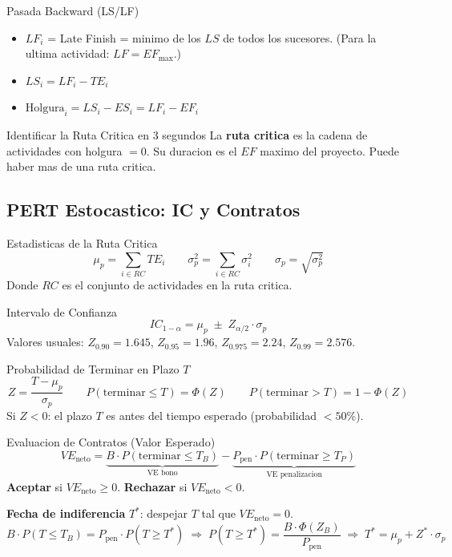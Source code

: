 \documentclass[11pt, a4paper]{article}
\begin{document}
\begin{formulas}{Pasada Backward (LS/LF)}
  \begin{itemize}[leftmargin=1.2em, itemsep=2pt]
    \item $LF_i$ = Late Finish = minimo de los $LS$ de todos los sucesores.
          (Para la ultima actividad: $LF = EF_{\max}$.)
    \item $LS_i = LF_i - TE_i$
    \item $\text{Holgura}_i = LS_i - ES_i = LF_i - EF_i$
  \end{itemize}
\end{formulas}

\begin{tipprueba}{Identificar la Ruta Critica en 3 segundos}
  La \textbf{ruta critica} es la cadena de actividades con holgura $= 0$.
  Su duracion es el $EF$ maximo del proyecto.
  Puede haber mas de una ruta critica.
\end{tipprueba}

\subsection{PERT Estocastico: IC y Contratos}

\begin{formulas}{Estadisticas de la Ruta Critica}
  \[
    \mu_p = \sum_{i \in RC} TE_i
    \qquad
    \sigma_p^2 = \sum_{i \in RC} \sigma_i^2
    \qquad
    \sigma_p = \sqrt{\sigma_p^2}
  \]
  Donde $RC$ es el conjunto de actividades en la ruta critica.
\end{formulas}

\begin{formulas}{Intervalo de Confianza}
  \[
    IC_{1-\alpha} = \mu_p \;\pm\; Z_{\alpha/2} \cdot \sigma_p
  \]
  Valores usuales: $Z_{0.90} = 1.645$, $Z_{0.95} = 1.96$, $Z_{0.975} = 2.24$,
  $Z_{0.99} = 2.576$.
\end{formulas}

\begin{formulas}{Probabilidad de Terminar en Plazo $T$}
  \[
    Z = \frac{T - \mu_p}{\sigma_p}
    \qquad
    P(\text{terminar} \le T) = \Phi(Z)
    \qquad
    P(\text{terminar} > T) = 1 - \Phi(Z)
  \]
  Si $Z < 0$: el plazo $T$ es antes del tiempo esperado (probabilidad $< 50\%$).
\end{formulas}

\begin{formulas}{Evaluacion de Contratos (Valor Esperado)}
  \[
    VE_{\text{neto}} = \underbrace{B \cdot P(\text{terminar} \le T_B)}_{\text{VE bono}}
                    - \underbrace{P_{\text{pen}} \cdot P(\text{terminar} \ge T_P)}_{\text{VE penalizacion}}
  \]
  \textbf{Aceptar} si $VE_{\text{neto}} \ge 0$. \textbf{Rechazar} si $VE_{\text{neto}} < 0$.

  \medskip
  \textbf{Fecha de indiferencia} $T^*$: despejar $T$ tal que $VE_{\text{neto}} = 0$.
  \[
    B \cdot P(T \le T_B) = P_{\text{pen}} \cdot P(T \ge T^*)
    \;\Rightarrow\;
    P(T \ge T^*) = \frac{B \cdot \Phi(Z_B)}{P_{\text{pen}}}
    \;\Rightarrow\;
    T^* = \mu_p + Z^* \cdot \sigma_p
  \]
\end{formulas}
\end{document}

